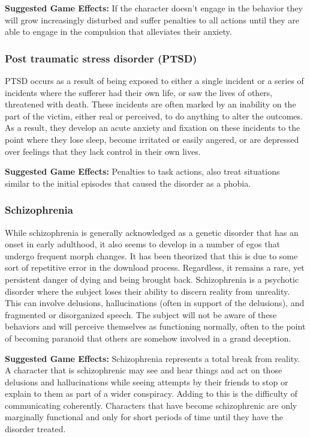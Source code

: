 \textbf{Suggested Game Effects:} If the character doesn’t engage in the behavior they will grow increasingly disturbed and suffer penalties to all actions until they are able to engage in the compulsion that alleviates their anxiety. 

\subsubsection{Post traumatic stress disorder (PTSD)} 

PTSD occurs as a result of being exposed to either a single incident or a series of incidents where the sufferer had their own life, or saw the lives of others, threatened with death. These incidents are often marked by an inability on the part of the victim, either real or perceived, to do anything to alter the outcomes. As a result, they develop an acute anxiety and fixation on these incidents to the point where they lose sleep, become irritated or easily angered, or are depressed over feelings that they lack control in their own lives. 

\textbf{Suggested Game Effects:} Penalties to task actions, also treat situations similar to the initial episodes that caused the disorder as a phobia. 

\subsubsection{Schizophrenia} 

While schizophrenia is generally acknowledged as a genetic disorder that has an onset in early adulthood, it also seems to develop in a number of egos that undergo frequent morph changes. It has been theorized that this is due to some sort of repetitive error in the download process. Regardless, it remains a rare, yet persistent danger of dying and being brought back. Schizophrenia is a psychotic disorder where the subject loses their ability to discern reality from unreality. This can involve delusions, hallucinations (often in support of the delusions), and fragmented or disorganized speech. The subject will not be aware of these behaviors and will perceive themselves as functioning normally, often to the point of becoming paranoid that others are somehow involved in a grand deception. 

\textbf{Suggested Game Effects:} Schizophrenia represents a total break from reality. A character that is schizophrenic may see and hear things and act on those delusions and hallucinations while seeing attempts by their friends to stop or explain to them as part of a wider conspiracy. Adding to this is the difficulty of communicating coherently. Characters that have become schizophrenic are only marginally functional and only for short periods of time until they have the disorder treated. 



